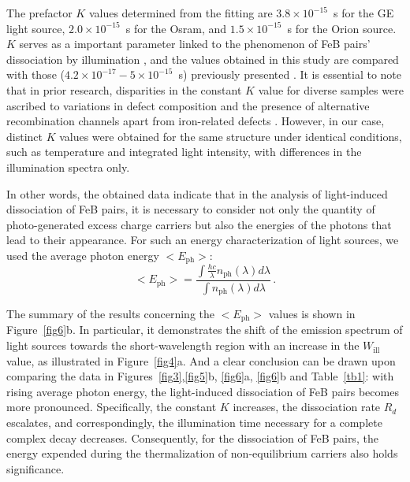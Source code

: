 \documentclass{WileyMSP-template}
\begin{document}
The prefactor $K$ values determined from the fitting are  
$3.8\times10^{-15}$~s for the GE light source, 
$2.0\times10^{-15}$~s for the Osram, and 
$1.5\times10^{-15}$~s for the Orion source. 
$K$ serves as a important parameter linked to the phenomenon of FeB pairs' dissociation by illumination \cite{FeBKin2019}, 
and the values obtained in this study are compared with those ($4.2\times10^{-17}-5\times10^{-15}$~s) previously presented \cite{FeBLight2,FeBAssJAP2014,FeBKin2019}. 
It is essential to note that in prior research, disparities in the constant $K$ value for diverse samples were ascribed 
to variations in defect composition and the presence of alternative recombination channels apart from iron-related defects \cite{FeBLight2,FeBAssJAP2014}. 
However, in our case, distinct $K$ values were obtained for the same structure under identical conditions, such as temperature and integrated light intensity, 
with differences in the illumination spectra only.

In other words, the obtained data indicate that in the analysis of light-induced dissociation of FeB pairs, 
it is necessary to consider not only the quantity of photo-generated excess charge carriers 
but also the energies of the photons that lead to their appearance. 
For such an energy characterization of light sources, we used the average photon energy $<E_\mathrm{ph}>$:
\begin{equation}
\label{eqEaver}
<E_\mathrm{ph}>=\frac{\int \frac{hc}{\lambda}n_\mathrm{ph}(\lambda)d\lambda}{\int n_\mathrm{ph}(\lambda)d\lambda}\,.
\end{equation}


The summary of the results concerning the $<E_\mathrm{ph}>$ values is shown in Figure~\ref{fig6}b. 
In particular, it demonstrates the shift of the emission spectrum of light sources 
towards the short-wavelength region with an increase in the $W_\mathrm{ill}$ value, as illustrated in Figure~\ref{fig4}a. 
And a clear conclusion can be drawn upon comparing the data in Figures~\ref{fig3},\ref{fig5}b, \ref{fig6}a, \ref{fig6}b
and Table~\ref{tb1}: 
with rising average photon energy, the light-induced dissociation of FeB pairs becomes more pronounced. 
Specifically, the constant $K$ increases, the dissociation rate $R_d$ escalates, 
and correspondingly, the illumination time necessary for a complete complex decay decreases. 
Consequently, for the dissociation of FeB pairs, the energy expended during the thermalization of non-equilibrium carriers also holds significance.
\end{document}
